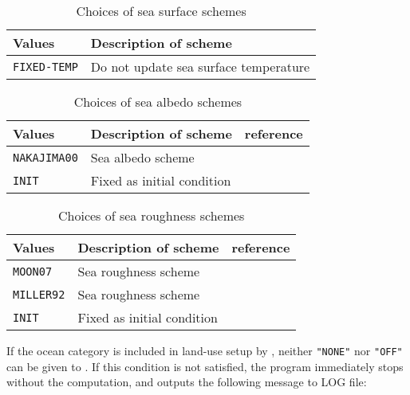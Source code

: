 \begin{table}[h]
\begin{center}
  \caption{Choices of sea surface schemes}
  \label{tab:nml_ocean_sfc}
  \begin{tabularx}{150mm}{lX} \hline
    \rowcolor[gray]{0.9}  Values & Description of scheme \\ \hline
      \verb|FIXED-TEMP| & Do not update sea surface temperature \\
    \hline
  \end{tabularx}
\end{center}
\end{table}

\begin{table}[h]
\begin{center}
  \caption{Choices of sea albedo schemes}
  \label{tab:nml_ocean_alb}
  \begin{tabularx}{150mm}{llX} \hline
    \rowcolor[gray]{0.9}  Values & Description of scheme & reference \\ \hline
      \verb|NAKAJIMA00| & Sea albedo scheme & \citet{nakajima_2000} \\
      \verb|INIT|       & Fixed as initial condition \\
    \hline
  \end{tabularx}
\end{center}
\end{table}

\begin{table}[h]
\begin{center}
  \caption{Choices of sea roughness schemes}
  \label{tab:nml_ocean_rgn}
  \begin{tabularx}{150mm}{llX} \hline
    \rowcolor[gray]{0.9}  Values & Description of scheme & reference \\ \hline
      \verb|MOON07|   & Sea roughness scheme & \citet{moon_2007} \\
      \verb|MILLER92| & Sea roughness scheme & \citet{miller_1992} \\
      \verb|INIT|     & Fixed as initial condition \\
    \hline
  \end{tabularx}
\end{center}
\end{table}

If the ocean category is included in land-use setup by , neither \verb|"NONE"| nor \verb|"OFF"| can be given to . If this condition is not satisfied, the program immediately stops without the computation, and outputs the following message to LOG file:

